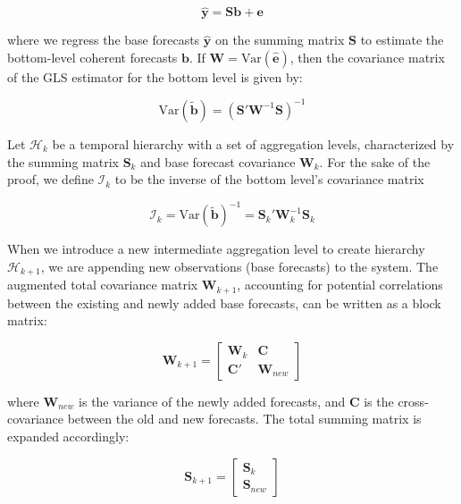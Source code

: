 \documentclass[sn-basic,Numbered,iicol]{sn-jnl}
\theoremstyle{thmstyleone}%
\theoremstyle{thmstyletwo}%
\theoremstyle{thmstylethree}%
\begin{document}
\begin{equation}
\hat{\mathbf{y}}=\mathbf{S}\mathbf{b}+\mathbf{e}
\end{equation}

where we regress the base forecasts $\hat{\mathbf{y}}$ on the summing matrix $\mathbf{S}$ to estimate the bottom-level coherent forecasts $\mathbf{b}$. If $\mathbf{W} = \text{Var}(\hat{\mathbf{e}})$, then the covariance matrix of the GLS estimator \cite{greeneeconometric} for the bottom level is given by:

\begin{equation}
\text{Var}(\tilde{\mathbf{b}})=(\mathbf{S}'\mathbf{W}^{-1}\mathbf{S})^{-1}
\end{equation}

Let $\mathcal{H}_k$ be a temporal hierarchy with a set of aggregation levels, characterized by the summing matrix $\mathbf{S}_k$ and base forecast covariance $\mathbf{W}_k$. For the sake of the proof, we define $\mathcal{I}_k$ to be the inverse of the bottom level's covariance matrix

\begin{equation}
\mathcal{I}_k=\text{Var}(\tilde{\mathbf{b}})^{-1}=\mathbf{S}_k'\mathbf{W}_k^{-1}\mathbf{S}_k
\end{equation}

When we introduce a new intermediate aggregation level to create hierarchy $\mathcal{H}_{k+1}$, we are appending new observations (base forecasts) to the system. The augmented total covariance matrix $\mathbf{W}_{k+1}$, accounting for potential correlations between the existing and newly added base forecasts, can be written as a block matrix:

\begin{equation}
\mathbf{W}_{k+1}=\begin{bmatrix}\mathbf{W}_k&\mathbf{C}\\\mathbf{C}'&\mathbf{W}_{new}\end{bmatrix}
\end{equation}

where $\mathbf{W}_{new}$ is the variance of the newly added forecasts, and $\mathbf{C}$ is the cross-covariance between the old and new forecasts. The total summing matrix is expanded accordingly:

\begin{equation}
\mathbf{S}_{k+1}=\begin{bmatrix}\mathbf{S}_k\\\mathbf{S}_{new}\end{bmatrix}
\end{equation}
\end{document}
